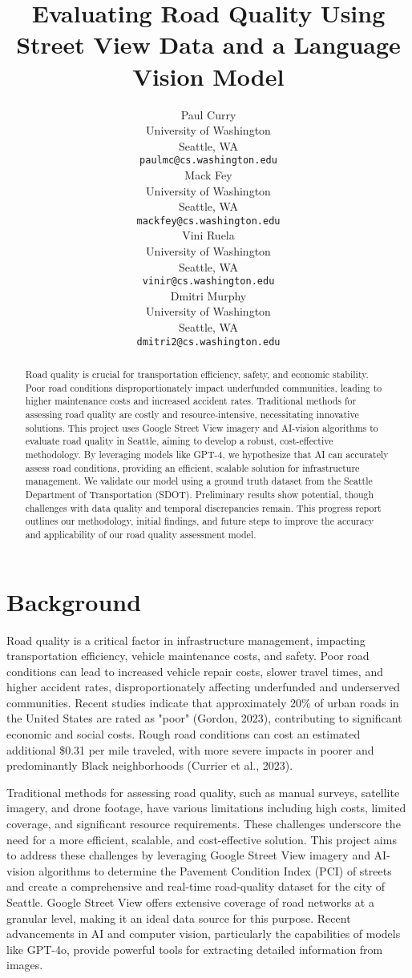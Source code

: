 \documentclass{article}
\title{Evaluating Road Quality Using Street View Data and a Language Vision Model}
\author{
  Paul Curry \\
  University of Washington \\
  Seattle, WA \\
  \texttt{paulmc@cs.washington.edu} \\
  \And
  Mack Fey \\
  University of Washington \\
  Seattle, WA \\
  \texttt{mackfey@cs.washington.edu} \\
  \And
  Vini Ruela \\
  University of Washington \\
  Seattle, WA \\
  \texttt{vinir@cs.washington.edu} \\
  \And
  Dmitri Murphy \\
  University of Washington \\
  Seattle, WA \\
  \texttt{dmitri2@cs.washington.edu} \\
}
\begin{document}
\maketitle


\begin{abstract}
Road quality is crucial for transportation efficiency, safety, and economic stability. Poor road conditions disproportionately impact underfunded communities, leading to higher maintenance costs and increased accident rates.
Traditional methods for assessing road quality are costly and resource-intensive, necessitating innovative solutions. This project uses Google Street View imagery and AI-vision algorithms to evaluate road quality in Seattle,
 aiming to develop a robust, cost-effective methodology. By leveraging models like GPT-4, we hypothesize that AI can accurately assess road conditions, providing an efficient,
 scalable solution for infrastructure management. We validate our model using a ground truth dataset from the Seattle Department of Transportation (SDOT).  Preliminary results show potential,
 though challenges with data quality and temporal discrepancies remain. This progress report outlines our methodology, initial findings, and future steps to improve the accuracy and applicability of our road quality assessment model.
\end{abstract}


\section{Background}

Road quality is a critical factor in infrastructure management, impacting transportation efficiency, vehicle maintenance costs, and safety. Poor road conditions can lead to increased vehicle repair costs, slower travel times, and higher accident rates, disproportionately affecting underfunded and underserved communities. Recent studies indicate that approximately 20\% of urban roads in the United States are rated as "poor" (Gordon, 2023), contributing to significant economic and social costs. Rough road conditions can cost an estimated additional \$0.31 per mile traveled, with more severe impacts in poorer and predominantly Black neighborhoods (Currier et al., 2023).

Traditional methods for assessing road quality, such as manual surveys, satellite imagery, and drone footage, have various limitations including high costs, limited coverage, and significant resource requirements. These challenges underscore the need for a more efficient, scalable, and cost-effective solution.
This project aims to address these challenges by leveraging Google Street View imagery and AI-vision algorithms to determine the Pavement Condition Index (PCI) of streets and create a comprehensive and real-time road-quality dataset for the city of Seattle. Google Street View offers extensive coverage of road networks at a granular level, making it an ideal data source for this purpose. Recent advancements in AI and computer vision, particularly the capabilities of models like GPT-4o, provide powerful tools for extracting detailed information from images.
\end{document}
